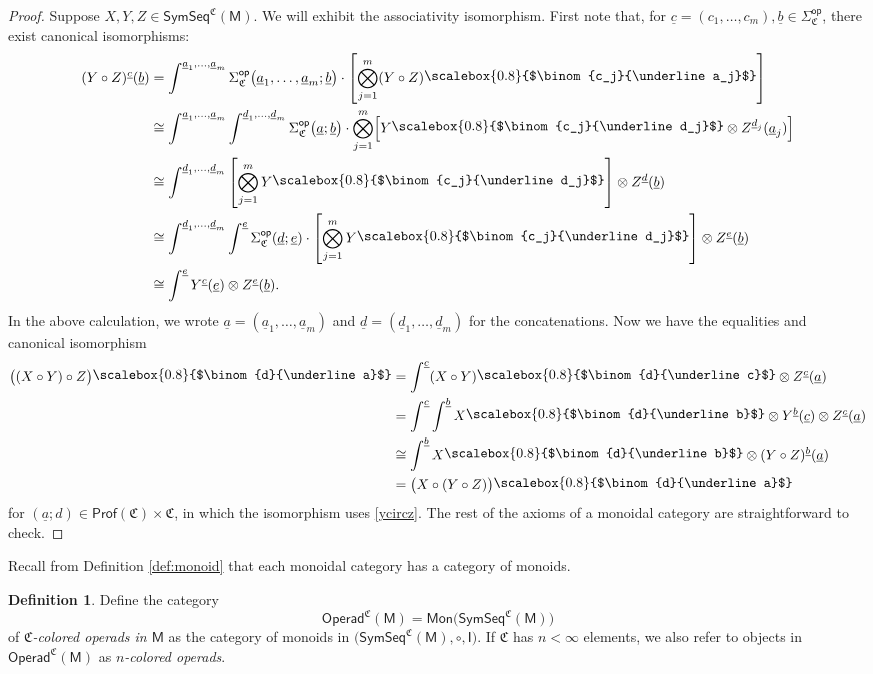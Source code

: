 \documentclass[11pt]{amsbook}
\numberwithin{section}{chapter}
\numberwithin{subsection}{section}
\numberwithin{equation}{section}
\theoremstyle{plain}
\theoremstyle{definition}
\newtheorem{definition}[equation]{Definition}
\newcommand{\colorc}{\mathfrak{C}}
\newcommand{\Prof}{\mathsf{Prof}}
\newcommand{\Profc}{\Prof(\colorc)}
\newcommand{\Profcc}{\Profc \times \colorc}
\newcommand{\op}{\mathsf{op}}
\newcommand{\I}{\mathsf{I}}
\newcommand{\M}{\mathsf{M}}
\newcommand{\Mon}{\mathsf{Mon}}
\newcommand{\Operad}{\mathsf{Operad}}
\newcommand{\Operadc}{\Operad^{\colorc}}
\newcommand{\Operadcm}{\Operadc(\M)}
\newcommand{\Sigmaop}{\Sigma^{\op}}
\newcommand{\Sigmacop}{\Sigmaop_{\colorc}}
\newcommand{\symseq}{\mathsf{SymSeq}}
\newcommand{\symseqcm}{\symseq^{\colorc}(\M)}
\newcommand{\ua}{\underline a}
\newcommand{\ub}{\underline b}
\newcommand{\uc}{\underline c}
\newcommand{\ud}{\underline d}
\newcommand{\ue}{\underline e}
\newcommand{\smallprof}[1]
{\raisebox{.05cm}{\scalebox{0.8}{#1}}}
\newcommand{\cjuaj}{\smallprof{$\binom{c_j}{\ua_j}$}}
\newcommand{\cjudj}{\smallprof{$\binom{c_j}{\ud_j}$}}
\newcommand{\dua}{\smallprof{$\binom{d}{\ua}$}}
\newcommand{\dub}{\smallprof{$\binom{d}{\ub}$}}
\newcommand{\duc}{\smallprof{$\binom{d}{\uc}$}}
\begin{document}
\begin{proof}
Suppose $X,Y,Z \in \symseqcm$.  We will exhibit the associativity isomorphism.  First note that, for $\uc=(c_1,\ldots,c_m), \ub \in \Sigmacop$, there exist canonical isomorphisms:
\begin{equation}\label{ycircz}
\begin{split}(Y \circ Z)^{\uc}(\ub) 
&= \int^{\ua_1,\ldots,\ua_m} \Sigmacop\bigl(\ua_1,\ldots,\ua_m;\ub\bigr) \cdot \left[\bigotimes_{j=1}^m (Y\circ Z)\cjuaj\right]\\
&\cong \int^{\ua_1,\ldots,\ua_m} \int^{\ud_1,\ldots,\ud_m} \Sigmacop\bigl(\ua;\ub\bigr) \cdot \bigotimes_{j=1}^m \Bigl[Y\cjudj \otimes Z^{\ud_j}(\ua_j)\Bigr]\\
&\cong \int^{\ud_1,\ldots,\ud_m} \left[\bigotimes_{j=1}^m Y\cjudj\right] \otimes Z^{\ud}(\ub)\\
&\cong \int^{\ud_1,\ldots,\ud_m} \int^{\ue} \Sigmacop(\ud;\ue) \cdot \left[\bigotimes_{j=1}^m Y\cjudj\right] \otimes Z^{\ue}(\ub)\\
&\cong \int^{\ue} Y^{\uc}(\ue) \otimes Z^{\ue}(\ub).\end{split}
\end{equation}
In the above calculation, we wrote $\ua=(\ua_1,\ldots,\ua_m)$ and $\ud=(\ud_1,\ldots,\ud_m)$ for the concatenations.  Now we have the equalities and canonical isomorphism
\[\begin{split}
\bigl((X \circ Y) \circ Z\bigr)\dua 
&= \int^{\uc} (X \circ Y)\duc \otimes Z^{\uc}(\ua)\\
&= \int^{\uc} \int^{\ub} X\dub \otimes Y^{\ub}(\uc) \otimes Z^{\uc}(\ua)\\
&\cong \int^{\ub} X\dub \otimes (Y \circ Z)^{\ub}(\ua)\\
&= \bigl(X \circ (Y \circ Z)\bigr)\dua\end{split}\]
for $(\ua;d) \in \Profcc$, in which the isomorphism uses \eqref{ycircz}.  The rest of the axioms of a monoidal category are straightforward to check.
\end{proof}

Recall from Definition \ref{def:monoid} that each monoidal category has a category of monoids.

\begin{definition}\label{def:operad}
Define the category
\[\Operadcm = \Mon\bigl(\symseqcm\bigr)\]
of \emph{$\colorc$-colored operads in $\M$} as the category of monoids in $\bigl(\symseqcm,\circ,\I\bigr)$.  If $\colorc$ has $n<\infty$ elements, we also refer to objects in $\Operadcm$ as \emph{$n$-colored operads}.
\end{definition}
\end{document}
